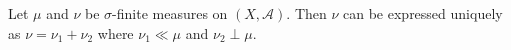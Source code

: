 Let $\mu$ and $\nu$ be $\sigma$-finite measures on $(X, \mathcal{A})$. Then $\nu$ can be expressed uniquely as $\nu = \nu_1 + \nu_2$ where $\nu_1 \ll \mu$ and $\nu_2 \perp \mu$.
